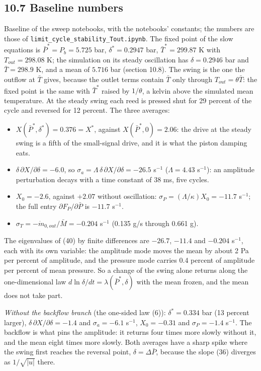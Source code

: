 \documentclass[11pt]{article}
\begin{document}
\subsection*{10.7 Baseline numbers}

Baseline of the sweep notebooks, with the notebooks' constants; the numbers are those of \texttt{limit\_\allowbreak cycle\_\allowbreak stability\_\allowbreak Tout.ipynb}. The fixed point of the slow equations is $\bar P^* = P_b = 5.725$ bar, $\delta^* = 0.2947$ bar, $\bar T^* = 299.87$ K with $T_{out} = 298.08$ K; the simulation on its steady oscillation has $\delta = 0.2946$ bar and $\bar T = 298.9$ K, and a mean of $5.716$ bar (section 10.8). The swing is the one the outflow at $\bar T$ gives, because the outlet terms contain $\bar T$ only through $T_{out} = \theta\bar T$: the fixed point is the same with $\bar T^*$ raised by $1/\theta$, a kelvin above the simulated mean temperature. At the steady swing each reed is pressed shut for 29 percent of the cycle and reversed for 12 percent. The three averages:
\begin{itemize}
\item $X(\bar P^*, \delta^*) = 0.376 = X^*$, against $X(\bar P^*, 0) = 2.06$: the drive at the steady swing is a fifth of the small-signal drive, and it is what the piston damping eats.
\item $\delta\,\partial X/\partial\delta = -6.0$, so $\sigma_a = \Lambda\,\delta\,\partial X/\partial\delta = -26.5$ s$^{-1}$ ($\Lambda = 4.43$ s$^{-1}$): an amplitude perturbation decays with a time constant of 38 ms, five cycles.
\item $X_0 = -2.6$, against $+2.07$ without oscillation: $\sigma_P = (\Lambda/\kappa)X_0 = -11.7$ s$^{-1}$; the full entry $\partial F_P/\partial\bar P$ is $-11.7$ s$^{-1}$.
\item $\sigma_T = -\dot m_{0,out}/\bar M = -0.204$ s$^{-1}$ (0.135 g/s through 0.661 g).
\end{itemize}
The eigenvalues of (40) by finite differences are $-26.7$, $-11.4$ and $-0.204$ s$^{-1}$, each with its own variable: the amplitude mode moves the mean by about 2 Pa per percent of amplitude, and the pressure mode carries 0.4 percent of amplitude per percent of mean pressure. So a change of the swing alone returns along the one-dimensional law $d\ln\delta/dt = \lambda(\bar P^*, \delta)$ with the mean frozen, and the mean does not take part.

\emph{Without the backflow branch} (the one-sided law (6)): $\delta^* = 0.334$ bar (13 percent larger), $\delta\,\partial X/\partial\delta = -1.4$ and $\sigma_a = -6.1$ s$^{-1}$, $X_0 = -0.31$ and $\sigma_P = -1.4$ s$^{-1}$. The backflow is what pins the amplitude: it returns four times more slowly without it, and the mean eight times more slowly. Both averages have a sharp spike where the swing first reaches the reversal point, $\delta = \Delta\bar P$, because the slope (36) diverges as $1/\sqrt{\lvert u\rvert}$ there.
\end{document}
